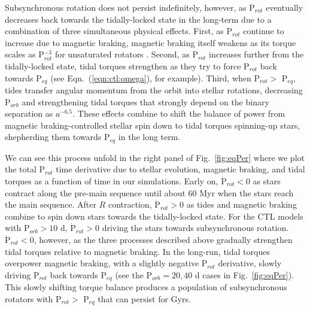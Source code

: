 \documentclass[twocolumn]{aastex61}
\begin{document}
Subsynchronous rotation does not persist indefinitely, however, as P$_{rot}$ eventually decreases back towards the tidally-locked state in the long-term due to a combination of three simultaneous physical effects.  First, as P$_{rot}$ continue to increase due to magnetic braking, magnetic braking itself weakens as its torque scales as P$_{rot}^{-3}$ for unsaturated rotators \citep{Matt2015}.  Second, as P$_{rot}$ increases further from the tidally-locked state, tidal torques strengthen as they try to force P$_{rot}$ back towards P$_{eq}$ (see Eqn.~(\ref{eqn:ctl:omega}), for example). Third, when P$_{rot} > $ P$_{eq}$, tides transfer angular momentum from the orbit into stellar rotations, decreasing P$_{orb}$ and strengthening tidal torques that strongly depend on the binary separation as $a^{-6.5}$.  These effects combine to shift the balance of power from magnetic braking-controlled stellar spin down to tidal torques spinning-up stars, shepherding them towards P$_{eq}$ in the long term. 

We can see this process unfold in the right panel of Fig.~\ref{fig:eqPer} where we plot the total P$_{rot}$ time derivative due to stellar evolution, magnetic braking, and tidal torques as a function of time in our simulations. Early on, $\dot{\mathrm{P}}_{rot} < 0$ as stars contract along the pre-main sequence until about 60 Myr when the stars reach the main sequence. After $R$ contraction, $\dot{\mathrm{P}}_{rot} > 0$ as tides and magnetic braking combine to spin down stars towards the tidally-locked state. For the CTL models with P$_{orb} > 10$ d, $\dot{\mathrm{P}}_{rot} > 0$ driving the stars towards subsynchronous rotation. $\ddot{\mathrm{P}}_{rot} < 0$, however, as the three processes described above gradually strengthen tidal torques relative to magnetic braking.  In the long-run, tidal torques overpower magnetic braking, with a slightly negative P$_{rot}$ derivative, slowly driving P$_{rot}$ back towards P$_{eq}$ (see the P$_{orb} = 20, 40$ d cases in Fig.~\ref{fig:eqPer}). This slowly shifting torque balance produces a population of subsynchronous rotators with P$_{rot} > $ P$_{eq}$ that can persist for Gyrs.  

\end{document}
